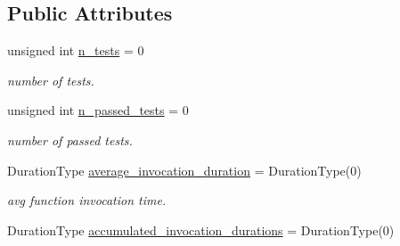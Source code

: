 \subsection*{Public Attributes}
\begin{DoxyCompactItemize}
\item 
unsigned int \hyperlink{structunittest_1_1_randomized_function_test_1_1_test_return_type_a65bc5e86c473fc8e0b9a1b07331675af}{n\+\_\+tests} = 0\hypertarget{structunittest_1_1_randomized_function_test_1_1_test_return_type_a65bc5e86c473fc8e0b9a1b07331675af}{}\label{structunittest_1_1_randomized_function_test_1_1_test_return_type_a65bc5e86c473fc8e0b9a1b07331675af}

\begin{DoxyCompactList}\small\item\em number of tests. \end{DoxyCompactList}\item 
unsigned int \hyperlink{structunittest_1_1_randomized_function_test_1_1_test_return_type_ac4031310315868bc18baabd93c4a265c}{n\+\_\+passed\+\_\+tests} = 0\hypertarget{structunittest_1_1_randomized_function_test_1_1_test_return_type_ac4031310315868bc18baabd93c4a265c}{}\label{structunittest_1_1_randomized_function_test_1_1_test_return_type_ac4031310315868bc18baabd93c4a265c}

\begin{DoxyCompactList}\small\item\em number of passed tests. \end{DoxyCompactList}\item 
Duration\+Type \hyperlink{structunittest_1_1_randomized_function_test_1_1_test_return_type_a0d416198cf899167fadc9596235790a7}{average\+\_\+invocation\+\_\+duration} = Duration\+Type(0)\hypertarget{structunittest_1_1_randomized_function_test_1_1_test_return_type_a0d416198cf899167fadc9596235790a7}{}\label{structunittest_1_1_randomized_function_test_1_1_test_return_type_a0d416198cf899167fadc9596235790a7}

\begin{DoxyCompactList}\small\item\em avg function invocation time. \end{DoxyCompactList}\item 
Duration\+Type \hyperlink{structunittest_1_1_randomized_function_test_1_1_test_return_type_ae47f7161ce8680e932d31158ef8b51e0}{accumulated\+\_\+invocation\+\_\+durations} = Duration\+Type(0)\hypertarget{structunittest_1_1_randomized_function_test_1_1_test_return_type_ae47f7161ce8680e932d31158ef8b51e0}{}\label{structunittest_1_1_randomized_function_test_1_1_test_return_type_ae47f7161ce8680e932d31158ef8b51e0}


\end{DoxyCompactItemize}
